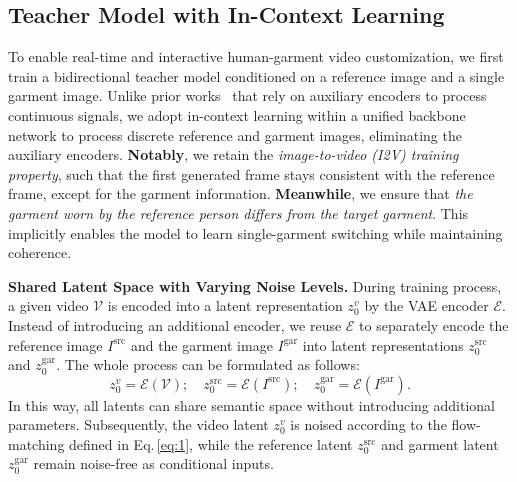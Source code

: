 \documentclass{llmxive}
\begin{document}
\subsection{Teacher Model with In-Context Learning}
\label{sec:3-1}
% 
To enable real-time and interactive human-garment video customization, we first train a bidirectional teacher model conditioned on a reference image and a single garment image.
% 
Unlike prior works~\cite{huang2025live,zhuang2025flashvsr,shin2025motionstream} that rely on auxiliary encoders to process continuous signals, we adopt in-context learning within a unified backbone network to process discrete reference and garment images, eliminating the auxiliary encoders.
% 
\textbf{Notably}, we retain the \textit{image-to-video (I2V) training property}, such that the first generated frame stays consistent with the reference frame, except for the garment information.
\textbf{Meanwhile}, we ensure that \textit{the garment worn by the reference person differs from the target garment}.
This implicitly enables the model to learn single-garment switching while maintaining coherence.

\noindent
\textbf{Shared Latent Space with Varying Noise Levels.}
% 
During training process, a given video $\mathcal{V}$ is encoded into a latent representation $z_{0}^{v}$ by the VAE encoder $\mathcal{E}$.
% 
Instead of introducing an additional encoder, we reuse $\mathcal{E}$ to separately encode the reference image $I^{\text{src}}$ and the garment image $I^{\text{gar}}$ into latent representations $z^{\text{src}}_{0}$ and $z^{\text{gar}}_{0}$.
% 
The whole process can be formulated as follows:
% 
\begin{equation}
    z^{v}_{0} = \mathcal{E}(\mathcal{V});\quad
    z^{\text{src}}_{0} = \mathcal{E}(I^{\text{src}});\quad
    z^{\text{gar}}_{0} = \mathcal{E}(I^{\text{gar}}).
\end{equation}
% 
In this way, all latents can share semantic space without introducing additional parameters.
% 
Subsequently, the video latent $z_{0}^{v}$ is noised according to the flow-matching defined in Eq.\,\ref{eq:1}, while the reference latent $z^{\text{src}}_{0}$ and garment latent $z^{\text{gar}}_{0}$ remain noise-free as conditional inputs.
\end{document}
